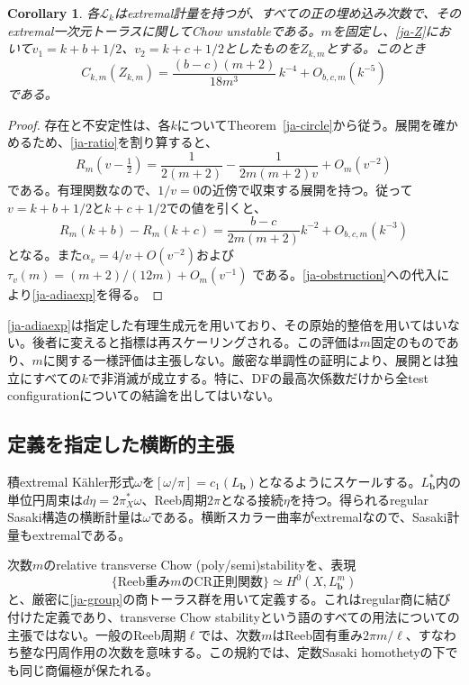 \documentclass[12pt]{amsart}
\newtheorem{cor}[thm]{Corollary}
\theoremstyle{definition}
\theoremstyle{remark}
\numberwithin{equation}{section}
\begin{document}
\begin{cor}\label{ja-adiaresult}
各$\mathcal L_k$はextremal計量を持つが、すべての正の埋め込み次数で、そのextremal一次元トーラスに関してChow unstableである。$m$を固定し、\eqref{ja-Z}において$v_1=k+b+1/2$、$v_2=k+c+1/2$としたものを$Z_{k,m}$とする。このとき
\begin{equation}\label{ja-adiaexp}
 C_{k,m}(Z_{k,m})
 =\frac{(b-c)(m+2)}{18m^3}\,k^{-4}
   +O_{b,c,m}(k^{-5})
\end{equation}
である。
\end{cor}
\begin{proof}
存在と不安定性は、各$k$についてTheorem~\ref{ja-circle}から従う。展開を確かめるため、\eqref{ja-ratio}を割り算すると、
\[
 R_m(v-\tfrac12)=\frac1{2(m+2)}
 -\frac1{2m(m+2)v}+O_m(v^{-2})
\]
である。有理関数なので、$1/v=0$の近傍で収束する展開を持つ。従って$v=k+b+1/2$と$k+c+1/2$での値を引くと、
\[
 R_m(k+b)-R_m(k+c)
 =\frac{b-c}{2m(m+2)}k^{-2}+O_{b,c,m}(k^{-3})
\]
となる。また$\alpha_v=4/v+O(v^{-2})$および
$\tau_v(m)=(m+2)/(12m)+O_m(v^{-1})$
である。\eqref{ja-obstruction}への代入により\eqref{ja-adiaexp}を得る。
\end{proof}

\eqref{ja-adiaexp}は指定した有理生成元を用いており、その原始的整倍を用いてはいない。後者に変えると指標は再スケーリングされる。この評価は$m$固定のものであり、$m$に関する一様評価は主張しない。厳密な単調性の証明により、展開とは独立にすべての$k$で非消滅が成立する。特に、DFの最高次係数だけから全test configurationについての結論を出してはいない。

\subsection{定義を指定した横断的主張}
積extremal Kähler形式$\omega$を$[\omega/\pi]=c_1(L_{\boldsymbol b})$となるようにスケールする。$L_{\boldsymbol b}^*$内の単位円周束は$d\eta=2\pi_X^*\omega$、Reeb周期$2\pi$となる接続$\eta$を持つ。得られるregular Sasaki構造の横断計量は$\omega$である。横断スカラー曲率がextremalなので、Sasaki計量もextremalである。

次数$m$のrelative transverse Chow (poly/semi)stabilityを、表現
\begin{equation}\label{ja-CR}
 \{\text{Reeb重み$m$のCR正則関数}\}
 \simeq H^0(X,L_{\boldsymbol b}^m)
\end{equation}
と、厳密に\eqref{ja-group}の商トーラス群を用いて定義する。これはregular商に結び付けた定義であり、transverse Chow stabilityという語のすべての用法についての主張ではない。一般のReeb周期$\ell$では、次数$m$はReeb固有重み$2\pi m/\ell$、すなわち整な円周作用の次数を意味する。この規約では、定数Sasaki homothetyの下でも同じ商偏極が保たれる。
\end{document}
